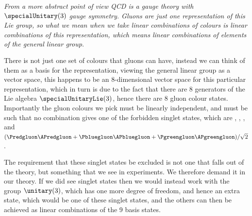 \documentclass[fleqn]{NotesClass}
\begin{document}
    \itshape
    From a more abstract point of view QCD is a gauge theory with \(\specialUnitary(3)\) gauge symmetry.
    Gluons are just one representation of this Lie group, so what we mean when we take linear combinations of colours is linear combinations of this representation, which means linear combinations of elements of the general linear group.
    
    There is not just one set of colours that gluons can have, instead we can think of them as a basis for the representation, viewing the general linear group as a vector space, this happens to be an 8-dimensional vector space for this particular representation, which in turn is due to the fact that there are 8 generators of the Lie algebra \(\specialUnitaryLie(3)\), hence there are 8 gluon colour states.
    Importantly the gluon colours we pick must be linearly independent, and must be such that no combination gives one of the forbidden singlet states, which are \Predgluon\APredgluon, \Pgreengluon\APgreengluon, \Pbluegluon\APbluegluon, and \((\Predgluon\APredgluon + \Pbluegluon\APbluegluon + \Pgreengluon\APgreengluon) / \sqrt{2}\).
    
    The requirement that these singlet states be excluded is not one that falls out of the theory, but something that we see in experiments.
    We therefore demand it in our theory.
    If we did see singlet states then we would instead work with the group \(\unitary(3)\), which has one more degree of freedom, and hence an extra state, which would be one of these singlet states, and the others can then be achieved as linear combinations of the 9 basis states.
    \normalfont
    
\end{document}
